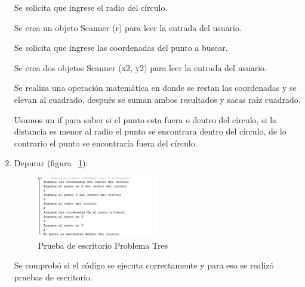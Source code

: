 \documentclass{IEEEcsmag}
\begin{document}
\begin{enumerate}
Se solicita que ingrese el radio del círculo.

Se crea un objeto Scanner (r) para leer la entrada del usuario. 

Se solicita que ingrese las coordenadas del punto a buscar.

Se crea dos objetos Scanner (x2, y2) para leer la entrada del usuario.

Se realiza una operación matemática en donde se restan las coordenadas y se elevan al cuadrado, después se suman ambos resultados y sacas raíz cuadrado.

Usamos un if para saber si el punto esta fuera o dentro del círculo, si la distancia es menor al radio el punto se encontrara dentro del círculo, de lo contrario el punto se encontraría fuera del círculo.

\item Depurar (figura ~\ref{fig:pruebaP3}):

\begin{figure}
\caption{Prueba de escritorio Problema Tres}
\centerline{\includegraphics[width=0.5\textwidth]{./latex-imagenes/pruebaDeskEj3.jpg}}
\vspace*{7pt}
\label{fig:pruebaP3}
\end{figure}

 Se comprobó si el código se ejecuta correctamente y para eso se realizó pruebas de escritorio.
 
\end{enumerate}

\vspace*{5pt}
\end{document}
